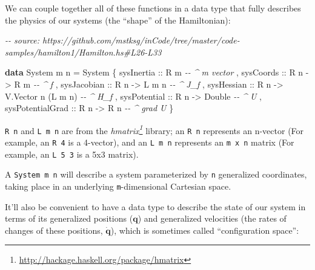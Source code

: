\documentclass[]{article}
\newenvironment{Shaded}{}{}
\newcommand{\CommentTok}[1]{\textcolor[rgb]{0.38,0.63,0.69}{\textit{#1}}}
\newcommand{\DataTypeTok}[1]{\textcolor[rgb]{0.56,0.13,0.00}{#1}}
\newcommand{\KeywordTok}[1]{\textcolor[rgb]{0.00,0.44,0.13}{\textbf{#1}}}
\newcommand{\NormalTok}[1]{#1}
\newcommand{\OtherTok}[1]{\textcolor[rgb]{0.00,0.44,0.13}{#1}}
\renewcommand{\href}[2]{#2\footnote{\url{#1}}}
\begin{document}
We can couple together all of these functions in a data type that fully
describes the physics of our systems (the ``shape'' of the Hamiltonian):

\begin{Shaded}
\begin{Highlighting}[]
\CommentTok{{-}{-} source: https://github.com/mstksg/inCode/tree/master/code{-}samples/hamilton1/Hamilton.hs\#L26{-}L33}

\KeywordTok{data} \DataTypeTok{System}\NormalTok{ m n }\OtherTok{=} \DataTypeTok{System}
\NormalTok{    \{}\OtherTok{ sysInertia       ::} \DataTypeTok{R}\NormalTok{ m                         }\CommentTok{{-}{-} \^{} \textquotesingle{}m\textquotesingle{} vector}
\NormalTok{    ,}\OtherTok{ sysCoords        ::} \DataTypeTok{R}\NormalTok{ n }\OtherTok{{-}>} \DataTypeTok{R}\NormalTok{ m                  }\CommentTok{{-}{-} \^{} f}
\NormalTok{    ,}\OtherTok{ sysJacobian      ::} \DataTypeTok{R}\NormalTok{ n }\OtherTok{{-}>} \DataTypeTok{L}\NormalTok{ m n                }\CommentTok{{-}{-} \^{} J\_f}
\NormalTok{    ,}\OtherTok{ sysHessian       ::} \DataTypeTok{R}\NormalTok{ n }\OtherTok{{-}>} \DataTypeTok{V.Vector}\NormalTok{ n (}\DataTypeTok{L}\NormalTok{ m n)   }\CommentTok{{-}{-} \^{} H\_f}
\NormalTok{    ,}\OtherTok{ sysPotential     ::} \DataTypeTok{R}\NormalTok{ n }\OtherTok{{-}>} \DataTypeTok{Double}               \CommentTok{{-}{-} \^{} U}
\NormalTok{    ,}\OtherTok{ sysPotentialGrad ::} \DataTypeTok{R}\NormalTok{ n }\OtherTok{{-}>} \DataTypeTok{R}\NormalTok{ n                  }\CommentTok{{-}{-} \^{} grad U}
\NormalTok{    \}}
\end{Highlighting}
\end{Shaded}

\texttt{R\ n} and \texttt{L\ m\ n} are from the
\emph{\href{http://hackage.haskell.org/package/hmatrix}{hmatrix}} library; an
\texttt{R\ n} represents an n-vector (For example, an \texttt{R\ 4} is a
4-vector), and an \texttt{L\ m\ n} represents an \texttt{m\ x\ n} matrix (For
example, an \texttt{L\ 5\ 3} is a 5x3 matrix).

A \texttt{System\ m\ n} will describe a system parameterized by \texttt{n}
generalized coordinates, taking place in an underlying \texttt{m}-dimensional
Cartesian space.

It'll also be convenient to have a data type to describe the state of our system
in terms of its generalized positions (\(\mathbf{q}\)) and generalized
velocities (the rates of changes of these positions, \(\dot{\mathbf{q}}\)),
which is sometimes called ``configuration space'':
\end{document}

